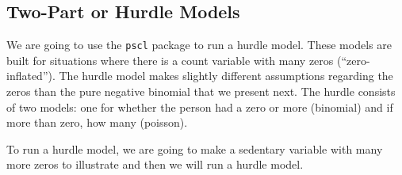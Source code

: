 \documentclass[]{tufte-book}
\newenvironment{Shaded}{}{}
\newcommand{\KeywordTok}[1]{\textcolor[rgb]{0.00,0.44,0.13}{\textbf{#1}}}
\newcommand{\DataTypeTok}[1]{\textcolor[rgb]{0.56,0.13,0.00}{#1}}
\newcommand{\DecValTok}[1]{\textcolor[rgb]{0.25,0.63,0.44}{#1}}
\newcommand{\StringTok}[1]{\textcolor[rgb]{0.25,0.44,0.63}{#1}}
\newcommand{\OtherTok}[1]{\textcolor[rgb]{0.00,0.44,0.13}{#1}}
\newcommand{\OperatorTok}[1]{\textcolor[rgb]{0.40,0.40,0.40}{#1}}
\newcommand{\NormalTok}[1]{#1}
\theoremstyle{definition}
\theoremstyle{definition}
\theoremstyle{remark}
\begin{document}
\subsection*{Two-Part or Hurdle Models}\label{two-part-or-hurdle-models}

We are going to use the \texttt{pscl} package to run a hurdle model.
These models are built for situations where there is a count variable
with many zeros (``zero-inflated''). The hurdle model makes slightly
different assumptions regarding the zeros than the pure negative
binomial that we present next. The hurdle consists of two models: one
for whether the person had a zero or more (binomial) and if more than
zero, how many (poisson).

To run a hurdle model, we are going to make a sedentary variable with
many more zeros to illustrate and then we will run a hurdle model.

\begin{Shaded}
\end{Shaded}
\end{document}
